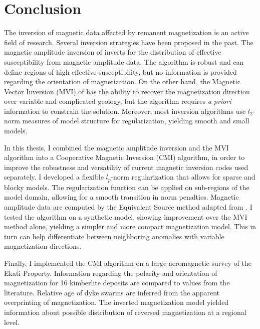 \graphicspath{{./Figures/}}
\chapter{Conclusion}
\label{ch:Chap7_Conclusion}

The inversion of magnetic data affected by remanent magnetization is an active field of research.
Several inversion strategies have been proposed in the past.
The magnetic amplitude inversion of \cite{Shearer05} inverts for the distribution of effective susceptibility from magnetic amplitude data.
The algorithm is robust and can define regions of high effective susceptibility, but no information is provided regarding the orientation of magnetization.
On the other hand, the Magnetic Vector Inversion (MVI) of \cite{Lelievre2009} has the ability to recover the magnetization direction over variable and complicated geology, but the algorithm requires \emph{a priori} information to constrain the solution.
Moreover, most inversion algorithms use $l_2$-norm measures of model structure for regularization, yielding smooth and small models.

 In this thesis, I combined the magnetic amplitude inversion and the MVI algorithm into a Cooperative Magnetic Inversion (CMI) algorithm, in order to improve the robustness and versatility of current magnetic inversion codes used separately. 
 I developed a flexible $l_p$-norm regularization that allows for sparse and blocky models. The regularization function can be applied on sub-regions of the model domain, allowing for a smooth transition in norm penalties.
Magnetic amplitude data are computed by the Equivalent Source method adapted from \cite{Li2010}.
I tested the algorithm on a synthetic model, showing improvement over the MVI method alone, yielding a simpler and more compact magnetization model. 
This in turn can help differentiate between neighboring anomalies with variable magnetization directions.

Finally, I implemented the CMI algorithm on a large aeromagnetic survey of the Ekati Property. 
Information regarding the polarity and orientation of magnetization for 16 kimberlite deposits are compared to values from the literature.
Relative age of dyke swarms are inferred from the apparent overprinting of magnetization.
The inverted magnetization model yielded information about possible distribution of reversed magnetization at a regional level.

